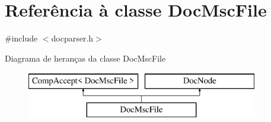 \hypertarget{class_doc_msc_file}{\section{Referência à classe Doc\-Msc\-File}
\label{class_doc_msc_file}
}


{\ttfamily \#include $<$docparser.\-h$>$}

Diagrama de heranças da classe Doc\-Msc\-File\begin{figure}[H]
\begin{center}
\leavevmode
\includegraphics[height=2.000000cm]{class_doc_msc_file}
\end{center}
\end{figure}
